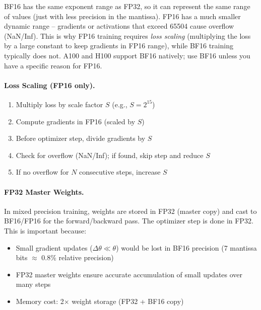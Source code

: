 \begin{intuitionbox}
BF16 has the same exponent range as FP32, so it can represent the same range of values (just with less precision in the mantissa). FP16 has a much smaller dynamic range -- gradients or activations that exceed 65504 cause overflow (NaN/Inf). This is why FP16 training requires \emph{loss scaling} (multiplying the loss by a large constant to keep gradients in FP16 range), while BF16 training typically does not. A100 and H100 support BF16 natively; use BF16 unless you have a specific reason for FP16.
\end{intuitionbox}

\paragraph{Loss Scaling (FP16 only).}
\label{loss-scaling-fp16-only.}

\begin{enumerate}
  \item Multiply loss by scale factor $S$ (e.g., $S = 2^{15}$)
  \item Compute gradients in FP16 (scaled by $S$)
  \item Before optimizer step, divide gradients by $S$
  \item Check for overflow (NaN/Inf); if found, skip step and reduce $S$
  \item If no overflow for $N$ consecutive steps, increase $S$
\end{enumerate}

\paragraph{FP32 Master Weights.}
\label{fp32-master-weights.}

In mixed precision training, weights are stored in FP32 (master copy) and cast to BF16/FP16 for the forward/backward pass. The optimizer step is done in FP32. This is important because:

\begin{itemize}
  \item Small gradient updates ($\Delta\theta \ll \theta$) would be lost in BF16 precision (7 mantissa bits $\approx$ 0.8\% relative precision)
  \item FP32 master weights ensure accurate accumulation of small updates over many steps
  \item Memory cost: 2$\times$ weight storage (FP32 + BF16 copy)
\end{itemize}

